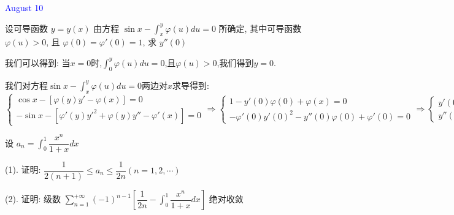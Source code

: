 \textcolor{blue}{August 10}

\begin{example}[][Exam: 34.2.5]
	设可导函数 $y=y(x)$ 由方程 $\sin x-\int_{x}^{y}\varphi(u)du=0$ 所确定,
	其中可导函数 $\varphi(u)>0$, 且 $\varphi(0)=\varphi'(0)=1$, 求 $y''(0)$
\end{example}

\begin{solution}

	我们可以得到:  当$x=0$时,$\int_{0}^{y}\varphi(u)du=0$,且$\varphi(u)>0$,我们得到$y=0$.
	
	我们对方程$\sin x-\int_{x}^{y}\varphi(u)du=0$两边对$x$求导得到:  
	$$\left\lbrace
	\begin{array}{l}
		\cos x-[\varphi(y)y'-\varphi(x)]=0\\
		-\sin x-[\varphi'(y)y'^2+\varphi(y)y''-\varphi'(x)]=0
	\end{array}
	\right. \Rightarrow \left\lbrace
	\begin{array}{l}
		1-y'(0)\varphi(0)+\varphi(x)=0\\
		-\varphi'(0)y'(0)^2-y''(0)\varphi(0)+\varphi'(0)=0
	\end{array}
	\right. \Rightarrow \left\lbrace
	\begin{array}{l}
		y'(0)=2\\
		y''(0)=-3
	\end{array}
	\right. $$
\end{solution}

\begin{example}[][Exam: 34.2.6]
	设 $a_{n}=\int_{0}^{1}\dfrac{x^n}{1+x}dx$

(1). 证明: $\dfrac{1}{2(n+1)}\leq a_{n}\leq \dfrac{1}{2n}(n=1,2,\cdots)$

(2). 证明: 级数 $\sum\limits_{n=1}^{+\infty}(-1)^{n-1}\left[\dfrac{1}{2n}-\int_{0}^{1}\dfrac{x^n}{1+x}dx\right]$ 绝对收敛
\end{example}

